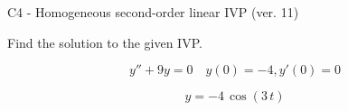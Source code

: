 \begin{exercise}
  \begin{exerciseTitle}C4 - Homogeneous second-order linear IVP (ver. 11)\end{exerciseTitle}
  \begin{exerciseStatement}
    
Find the solution to the given IVP.

    
\[y''+9y = 0 \hspace{1em} y(0) = -4 , y'(0) = 0\]

  \end{exerciseStatement}
  \begin{exerciseAnswer}
    
\[y= -4 \, \cos\left(3 \, t\right)\]

  \end{exerciseAnswer}
\end{exercise}